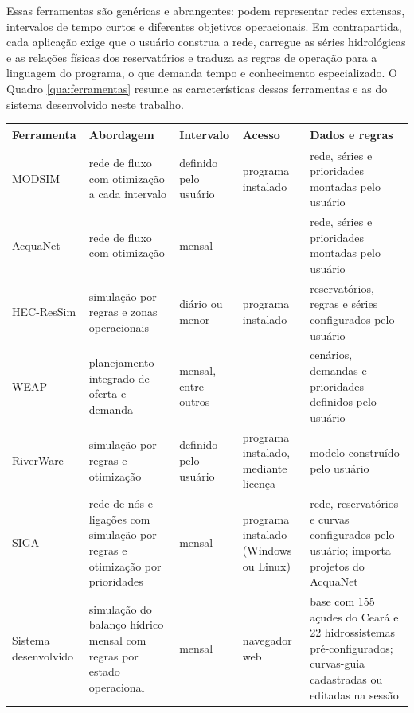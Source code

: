 Essas ferramentas são genéricas e abrangentes: podem representar redes extensas, intervalos de tempo curtos e diferentes objetivos operacionais. Em contrapartida, cada aplicação exige que o usuário construa a rede, carregue as séries hidrológicas e as relações físicas dos reservatórios e traduza as regras de operação para a linguagem do programa, o que demanda tempo e conhecimento especializado. O Quadro \ref{qua:ferramentas} resume as características dessas ferramentas e as do sistema desenvolvido neste trabalho.

\begin{quadro}[H]
    \captionsetup{width=15cm}
    \caption{Características de ferramentas de simulação de sistemas de reservatórios e do sistema desenvolvido}
    \label{qua:ferramentas}
    \centering
    \footnotesize
    \renewcommand{\arraystretch}{1.35}
    \begin{tabular}{|>{\raggedright\arraybackslash}p{2.1cm}|>{\raggedright\arraybackslash}p{3.4cm}|>{\raggedright\arraybackslash}p{2.0cm}|>{\raggedright\arraybackslash}p{2.4cm}|>{\raggedright\arraybackslash}p{3.6cm}|}
        \hline
        \textbf{Ferramenta} & \textbf{Abordagem} & \textbf{Intervalo} & \textbf{Acesso} & \textbf{Dados e regras} \\
        \hline
        MODSIM & rede de fluxo com otimização a cada intervalo & definido pelo usuário & programa instalado & rede, séries e prioridades montadas pelo usuário \\
        \hline
        AcquaNet & rede de fluxo com otimização & mensal & --- & rede, séries e prioridades montadas pelo usuário \\
        \hline
        HEC-ResSim & simulação por regras e zonas operacionais & diário ou menor & programa instalado & reservatórios, regras e séries configurados pelo usuário \\
        \hline
        WEAP & planejamento integrado de oferta e demanda & mensal, entre outros & --- & cenários, demandas e prioridades definidos pelo usuário \\
        \hline
        RiverWare & simulação por regras e otimização & definido pelo usuário & programa instalado, mediante licença & modelo construído pelo usuário \\
        \hline
        SIGA & rede de nós e ligações com simulação por regras e otimização por prioridades & mensal & programa instalado (Windows ou Linux) & rede, reservatórios e curvas configurados pelo usuário; importa projetos do AcquaNet \\
        \hline
        Sistema desenvolvido & simulação do balanço hídrico mensal com regras por estado operacional & mensal & navegador web & base com 155 açudes do Ceará e 22 hidrossistemas pré-configurados; curvas-guia cadastradas ou editadas na sessão \\
        \hline
    \end{tabular}
\end{quadro}

